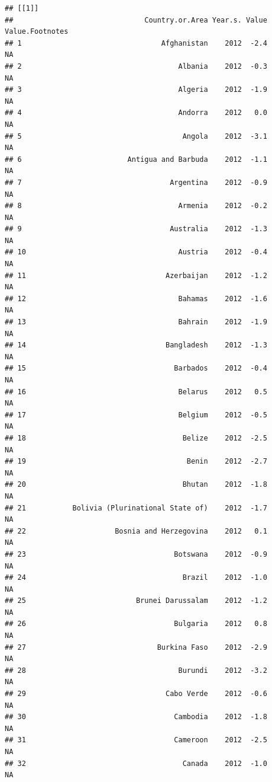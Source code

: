 \documentclass[
]{book}
\begin{document}
\begin{verbatim}
## [[1]]
##                               Country.or.Area Year.s. Value Value.Footnotes
## 1                                 Afghanistan    2012  -2.4              NA
## 2                                     Albania    2012  -0.3              NA
## 3                                     Algeria    2012  -1.9              NA
## 4                                     Andorra    2012   0.0              NA
## 5                                      Angola    2012  -3.1              NA
## 6                         Antigua and Barbuda    2012  -1.1              NA
## 7                                   Argentina    2012  -0.9              NA
## 8                                     Armenia    2012  -0.2              NA
## 9                                   Australia    2012  -1.3              NA
## 10                                    Austria    2012  -0.4              NA
## 11                                 Azerbaijan    2012  -1.2              NA
## 12                                    Bahamas    2012  -1.6              NA
## 13                                    Bahrain    2012  -1.9              NA
## 14                                 Bangladesh    2012  -1.3              NA
## 15                                   Barbados    2012  -0.4              NA
## 16                                    Belarus    2012   0.5              NA
## 17                                    Belgium    2012  -0.5              NA
## 18                                     Belize    2012  -2.5              NA
## 19                                      Benin    2012  -2.7              NA
## 20                                     Bhutan    2012  -1.8              NA
## 21           Bolivia (Plurinational State of)    2012  -1.7              NA
## 22                     Bosnia and Herzegovina    2012   0.1              NA
## 23                                   Botswana    2012  -0.9              NA
## 24                                     Brazil    2012  -1.0              NA
## 25                          Brunei Darussalam    2012  -1.2              NA
## 26                                   Bulgaria    2012   0.8              NA
## 27                               Burkina Faso    2012  -2.9              NA
## 28                                    Burundi    2012  -3.2              NA
## 29                                 Cabo Verde    2012  -0.6              NA
## 30                                   Cambodia    2012  -1.8              NA
## 31                                   Cameroon    2012  -2.5              NA
## 32                                     Canada    2012  -1.0              NA

\end{verbatim}
\end{document}
